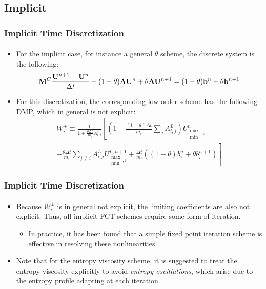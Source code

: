\documentclass{beamer}
\begin{document}
\subsection{Implicit}
\begin{frame}
\frametitle{Implicit Time Discretization}
\framesubtitle{}

\begin{itemize}
   \item For the implicit case, for instance a general $\theta$ scheme, the
      discrete system is the following:
      \begin{equation}
        \mathbf{M}^C\frac{\mathbf{U}^{n+1}-\mathbf{U}^n}{\Delta t}
        + (1-\theta)\mathbf{A}\mathbf{U}^n + \theta\mathbf{A}\mathbf{U}^{n+1}
        = (1-\theta)\mathbf{b}^n + \theta\mathbf{b}^{n+1}
      \end{equation}
   \item For this discretization, the corresponding low-order scheme
      has the following DMP, which in general is not explicit:
      \begin{multline}
         W_i^\pm \equiv \frac{1}{1+\frac{\theta\Delta t}{m_i}A_{i,i}^L}
           \left[\left(1 - \frac{(1-\theta)
           \Delta t}{m_i}\sum\limits_j A_{i,j}^L\right)
           U_{\substack{\max\\\min},i}^n\right.\\\left.
          -\frac{\theta\Delta t}{m_i}\sum\limits_{j\ne i}A_{i,j}^L
           U_{\substack{\max\\\min},i}^{L,n+1}
          +\frac{\Delta t}{m_i}\left((1-\theta)b_i^n + \theta b_i^{n+1}\right)\right]
      \end{multline}
\end{itemize}

\end{frame}
\begin{frame}
\frametitle{Implicit Time Discretization}
\framesubtitle{}

\begin{itemize}
   \item Because $W_i^\pm$ is in general not explicit, the limiting coefficients
      are also not explicit. Thus, all implicit FCT schemes require some form
      of iteration.
      \begin{itemize}
         \item In practice, it has been found that a simple fixed point iteration
            scheme is effective in resolving these nonlinearities.
      \end{itemize}
   \item Note that for the entropy viscosity scheme, it is suggested to treat
      the entropy viscosity explicitly to avoid \emph{entropy oscillations},
      which arise due to the entropy profile adapting at each iteration.
\end{itemize}

\end{frame}
\end{document}
